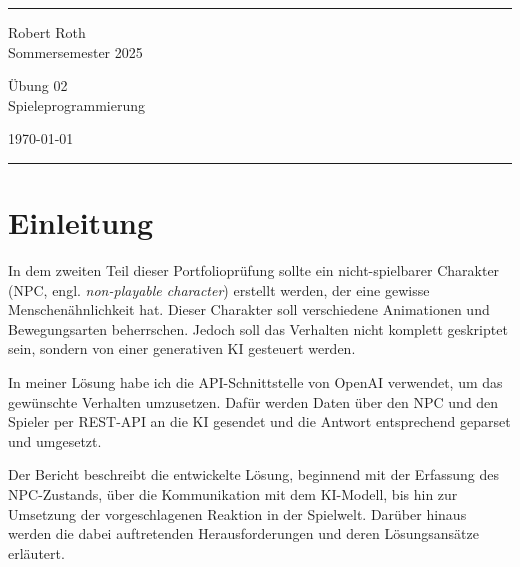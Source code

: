 \documentclass[a4paper]{article}
\begin{document}

\fancyhead[C]{}
\hrule \medskip %
\begin{minipage}{0.295\textwidth} 
\raggedright
\footnotesize
Robert Roth \hfill\\   
Sommersemester 2025\hfill\\  
\end{minipage}
\begin{minipage}{0.4\textwidth} 
\centering 
\large 
Übung 02\\ 
\normalsize 
Spieleprogrammierung\\ 
\end{minipage}
\begin{minipage}{0.295\textwidth} 
\raggedleft
\today\hfill\\
\end{minipage}
\medskip\hrule 
\bigskip



\section{Einleitung}
In dem zweiten Teil dieser Portfolioprüfung sollte ein nicht-spielbarer Charakter (NPC, engl. \textit{non-playable character}) erstellt werden, der eine gewisse Menschenähnlichkeit hat. Dieser Charakter soll verschiedene Animationen und Bewegungsarten beherrschen. Jedoch soll das Verhalten nicht komplett geskriptet sein, sondern von einer generativen KI gesteuert werden. 

In meiner Lösung habe ich die API-Schnittstelle von OpenAI verwendet, um das gewünschte Verhalten umzusetzen.  Dafür werden Daten über den NPC und den Spieler per REST-API an die KI gesendet und die Antwort entsprechend geparset und umgesetzt. 

Der Bericht beschreibt die entwickelte Lösung, beginnend mit der Erfassung des NPC-Zustands, über die Kommunikation mit dem KI-Modell, bis hin zur Umsetzung der vorgeschlagenen Reaktion in der Spielwelt. Darüber hinaus werden die dabei auftretenden Herausforderungen und deren Lösungsansätze erläutert.
\end{document}
